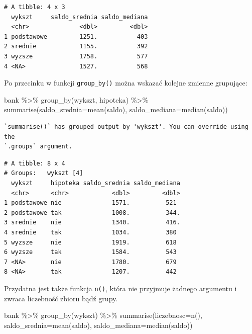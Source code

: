 \documentclass[
  letterpaper,
  DIV=11,
  numbers=noendperiod]{scrreprt}
\newenvironment{Shaded}{\begin{snugshade}}{\end{snugshade}}
\newcommand{\AttributeTok}[1]{\textcolor[rgb]{0.40,0.45,0.13}{#1}}
\newcommand{\FunctionTok}[1]{\textcolor[rgb]{0.28,0.35,0.67}{#1}}
\newcommand{\NormalTok}[1]{\textcolor[rgb]{0.00,0.23,0.31}{#1}}
\newcommand{\SpecialCharTok}[1]{\textcolor[rgb]{0.37,0.37,0.37}{#1}}
\begin{document}
\begin{verbatim}
# A tibble: 4 x 3
  wykszt     saldo_srednia saldo_mediana
  <chr>              <dbl>         <dbl>
1 podstawowe         1251.           403
2 srednie            1155.           392
3 wyzsze             1758.           577
4 <NA>               1527.           568
\end{verbatim}

Po przecinku w funkcji \texttt{group\_by()} można wskazać kolejne
zmienne grupujące:

\begin{Shaded}
\begin{Highlighting}[]
\NormalTok{bank }\SpecialCharTok{\%\textgreater{}\%}
  \FunctionTok{group\_by}\NormalTok{(wykszt, hipoteka) }\SpecialCharTok{\%\textgreater{}\%}
  \FunctionTok{summarise}\NormalTok{(}\AttributeTok{saldo\_srednia=}\FunctionTok{mean}\NormalTok{(saldo),}
            \AttributeTok{saldo\_mediana=}\FunctionTok{median}\NormalTok{(saldo))}
\end{Highlighting}
\end{Shaded}

\begin{verbatim}
`summarise()` has grouped output by 'wykszt'. You can override using the
`.groups` argument.
\end{verbatim}

\begin{verbatim}
# A tibble: 8 x 4
# Groups:   wykszt [4]
  wykszt     hipoteka saldo_srednia saldo_mediana
  <chr>      <chr>            <dbl>         <dbl>
1 podstawowe nie              1571.          521 
2 podstawowe tak              1008.          344.
3 srednie    nie              1340.          416.
4 srednie    tak              1034.          380 
5 wyzsze     nie              1919.          618 
6 wyzsze     tak              1584.          543 
7 <NA>       nie              1780.          679 
8 <NA>       tak              1207.          442 
\end{verbatim}

Przydatna jest także funkcja \texttt{n()}, która nie przyjmuje żadnego
argumentu i zwraca liczebność zbioru bądź grupy.

\begin{Shaded}
\begin{Highlighting}[]
\NormalTok{bank }\SpecialCharTok{\%\textgreater{}\%}
  \FunctionTok{group\_by}\NormalTok{(wykszt) }\SpecialCharTok{\%\textgreater{}\%}
  \FunctionTok{summarise}\NormalTok{(}\AttributeTok{liczebnosc=}\FunctionTok{n}\NormalTok{(),}
            \AttributeTok{saldo\_srednia=}\FunctionTok{mean}\NormalTok{(saldo),}
            \AttributeTok{saldo\_mediana=}\FunctionTok{median}\NormalTok{(saldo))}
\end{Highlighting}
\end{Shaded}
\end{document}
